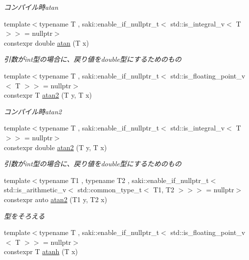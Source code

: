 \begin{DoxyCompactItemize}
\begin{DoxyCompactList}\small\item\em コンパイル時atan \end{DoxyCompactList}\item 
{\footnotesize template$<$typename T , saki\+::enable\+\_\+if\+\_\+nullptr\+\_\+t$<$ std\+::is\+\_\+integral\+\_\+v$<$ T $>$$>$  = nullptr$>$ }\\constexpr double \mbox{\hyperlink{namespacesaki_acd8a08085fc9210a4e8d61f6c04febe2}{atan}} (T x)
\begin{DoxyCompactList}\small\item\em 引数がint型の場合に、戻り値をdouble型にするためのもの \end{DoxyCompactList}\item 
{\footnotesize template$<$typename T , saki\+::enable\+\_\+if\+\_\+nullptr\+\_\+t$<$ std\+::is\+\_\+floating\+\_\+point\+\_\+v$<$ T $>$$>$  = nullptr$>$ }\\constexpr T \mbox{\hyperlink{namespacesaki_ac528a4ab6013623bfe6257229e302015}{atan2}} (T y, T x)
\begin{DoxyCompactList}\small\item\em コンパイル時atan2 \end{DoxyCompactList}\item 
{\footnotesize template$<$typename T , saki\+::enable\+\_\+if\+\_\+nullptr\+\_\+t$<$ std\+::is\+\_\+integral\+\_\+v$<$ T $>$$>$  = nullptr$>$ }\\constexpr double \mbox{\hyperlink{namespacesaki_a1f8c6dc6223b790f6d227c8d22cf8b86}{atan2}} (T y, T x)
\begin{DoxyCompactList}\small\item\em 引数がint型の場合に、戻り値をdouble型にするためのもの \end{DoxyCompactList}\item 
{\footnotesize template$<$typename T1 , typename T2 , saki\+::enable\+\_\+if\+\_\+nullptr\+\_\+t$<$ std\+::is\+\_\+arithmetic\+\_\+v$<$ std\+::common\+\_\+type\+\_\+t$<$ T1, T2 $>$$>$$>$  = nullptr$>$ }\\constexpr auto \mbox{\hyperlink{namespacesaki_a3f53502e50280167d22bef45227219f0}{atan2}} (T1 y, T2 x)
\begin{DoxyCompactList}\small\item\em 型をそろえる \end{DoxyCompactList}\item 
{\footnotesize template$<$typename T , saki\+::enable\+\_\+if\+\_\+nullptr\+\_\+t$<$ std\+::is\+\_\+floating\+\_\+point\+\_\+v$<$ T $>$$>$  = nullptr$>$ }\\constexpr T \mbox{\hyperlink{namespacesaki_adbfceeab527c51676d00fae31e077dcf}{atanh}} (T x)

\end{DoxyCompactItemize}
